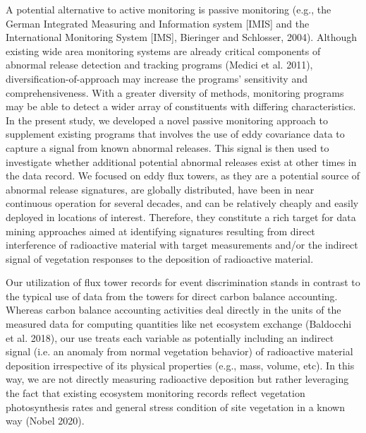 \documentclass{article}
\begin{document}
A potential alternative to active monitoring is passive monitoring (e.g., the German Integrated Measuring and Information system [IMIS] and the International Monitoring System [IMS], Bieringer and Schlosser, 2004). Although existing wide area monitoring systems are already critical components of abnormal release detection and tracking programs (Medici et al. 2011), diversification-of-approach may increase the programs’ sensitivity and comprehensiveness. With a greater diversity of methods, monitoring programs may be able to detect a wider array of constituents with differing characteristics. In the present study, we developed a novel passive monitoring approach to supplement existing programs that involves the use of eddy covariance data to capture a signal from known abnormal releases. This signal is then used to investigate whether additional potential abnormal releases exist at other times in the data record. We focused on eddy flux towers, as they are a potential source of abnormal release signatures, are globally distributed, have been in near continuous operation for several decades, and can be relatively cheaply and easily deployed in locations of interest. Therefore, they constitute a rich target for data mining approaches aimed at identifying signatures resulting from direct interference of radioactive material with target measurements and/or the indirect signal of vegetation responses to the deposition of radioactive material.

Our utilization of flux tower records for event discrimination stands in contrast to the typical use of data from the towers for direct carbon balance accounting. Whereas carbon balance accounting activities deal directly in the units of the measured data for computing quantities like net ecosystem exchange (Baldocchi et al. 2018), our use treats each variable as potentially including an indirect signal (i.e. an anomaly from normal vegetation behavior) of radioactive material deposition irrespective of its physical properties (e.g., mass, volume, etc). In this way, we are not directly measuring radioactive deposition but rather leveraging the fact that existing ecosystem monitoring records reflect vegetation photosynthesis rates and general stress condition of site vegetation in a known way (Nobel 2020).
\end{document}
